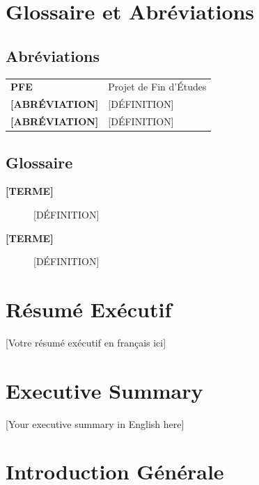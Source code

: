 \documentclass[12pt,a4paper,openany,oneside,draft]{report}
\begin{document}
\chapter*{Glossaire et Abréviations}
\thispagestyle{plain}

\section*{Abréviations}
\begin{tabular}{ll}
    \textbf{PFE} & Projet de Fin d'Études \\
    \textbf{[ABRÉVIATION]} & [DÉFINITION] \\
    \textbf{[ABRÉVIATION]} & [DÉFINITION] \\
\end{tabular}

\section*{Glossaire}
\begin{description}
    \item[\textbf{[TERME]}] [DÉFINITION]
    \item[\textbf{[TERME]}] [DÉFINITION]
\end{description}

\clearpage

\chapter*{Résumé Exécutif}

[Votre résumé exécutif en français ici]

\clearpage

\chapter*{Executive Summary}

[Your executive summary in English here]

\clearpage


\chapter{Introduction Générale}
\end{document}
